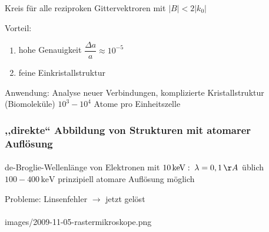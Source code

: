 Kreis f\"ur alle reziproken Gittervektroren mit $|B|<2|k_{0}|$

Vorteil:
\begin{enumerate}
\item hohe Genauigkeit $\dfrac{\Delta a}{a}\approx10^{-5}$
\item feine Einkristallstruktur
\end{enumerate}
Anwendung: Analyse neuer Verbindungen, komplizierte Kristallstruktur
(Biomolek\"ule) $10^{3}-10^{4}$ Atome pro Einheitszelle


\subsubsection{,,direkte{}`` Abbildung von Strukturen mit atomarer Aufl\"osung}


\paragraph{ }

de-Broglie-Wellenl\"ange von Elektronen mit $10\,\text{keV}:\;\lambda=0,1\,\AA$
\"ublich $100-400\,\text{keV}$ prinzipiell atomare Aufl\"osung m\"oglich 

Probleme: Linsenfehler $\to$ jetzt gel\"ost


\paragraph{ }

images/2009-11-05-rastermikroskope.png

